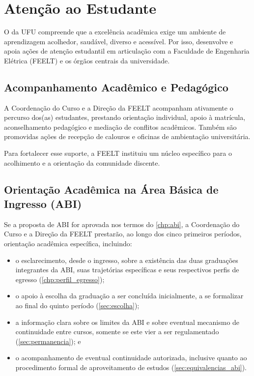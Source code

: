 \chapter{Atenção ao Estudante}
\label{chp:atendimento_estudante}

O \ppccurso da UFU compreende que a excelência acadêmica exige um ambiente de aprendizagem acolhedor, saudável, diverso e acessível. Por isso, desenvolve e apoia ações de atenção estudantil em articulação com a Faculdade de Engenharia Elétrica (FEELT) e os órgãos centrais da universidade.

\section{Acompanhamento Acadêmico e Pedagógico}

A Coordenação do Curso e a Direção da FEELT acompanham ativamente o percurso dos(as) estudantes, prestando orientação individual, apoio à matrícula, aconselhamento pedagógico e mediação de conflitos acadêmicos. Também são promovidas ações de recepção de calouros e oficinas de ambientação universitária.

Para fortalecer esse suporte, a FEELT instituiu um núcleo específico para o acolhimento e a orientação da comunidade discente.

\section{Orientação Acadêmica na Área Básica de Ingresso (ABI)}
\label{sec:orientacao_academica_abi}

Se a proposta de ABI for aprovada nos termos do \autoref{chp:abi}, a Coordenação do Curso e a Direção da FEELT prestarão, ao longo dos cinco primeiros períodos, orientação acadêmica específica, incluindo:

\begin{itemize}
    \item o esclarecimento, desde o ingresso, sobre a existência das duas graduações integrantes da ABI, suas trajetórias específicas e seus respectivos perfis de egresso (\autoref{chp:perfil_egresso});
    \item o apoio à escolha da graduação a ser concluída inicialmente, a se formalizar ao final do quinto período (\autoref{sec:escolha});
    \item a informação clara sobre os limites da ABI e sobre eventual mecanismo de continuidade entre cursos, somente se este vier a ser regulamentado (\autoref{sec:permanencia}); e
    \item o acompanhamento de eventual continuidade autorizada, inclusive quanto ao procedimento formal de aproveitamento de estudos (\autoref{sec:equivalencias_abi}).
\end{itemize}

